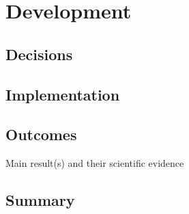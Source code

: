 \chapter{Development}

\section{Decisions}
  \section{Implementation}
  \section{Outcomes}
  Main result(s) and their scientific evidence
\section{Summary}
